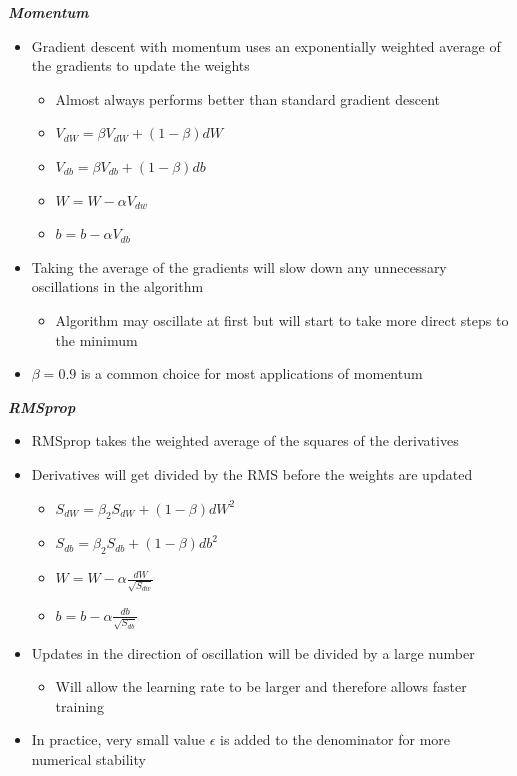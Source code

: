 \documentclass[12pt, letterpaper]{article}
\begin{document}
    \vspace{5mm}
    \textbf{\textit{Momentum}}
    \begin{itemize}
        \item Gradient descent with momentum uses an exponentially weighted average of the gradients to update the weights
        \begin{itemize}
            \item Almost always performs better than standard gradient descent
            \item[] $V_{dW}=\beta V_{dW}+(1-\beta)dW$
            \item[] $V_{db}=\beta V_{db}+(1-\beta)db$
            \item[] $W=W-\alpha V_{dw}$
            \item[] $b=b-\alpha V_{db}$
        \end{itemize}
        
        
        
        \item Taking the average of the gradients will slow down any unnecessary oscillations in the algorithm
        \begin{itemize}
            \item Algorithm may oscillate at first but will start to take more direct steps to the minimum
        \end{itemize}
        \item $\beta=0.9$ is a common choice for most applications of momentum
    \end{itemize}

    \vspace{5mm}
    \textbf{\textit{RMSprop}}
    \begin{itemize}
        \item RMSprop takes the weighted average of the squares of the derivatives
        \item Derivatives will get divided by the RMS before the weights are updated
        \begin{itemize}
            \item[] $S_{dW}=\beta_2S_{dW}+(1-\beta)dW^2$
            \item[] $S_{db}=\beta_2S_{db}+(1-\beta)db^2$
            \item[] $W=W-\alpha\frac{dW}{\sqrt{S_{dw}}}$
            \item[] $b=b-\alpha\frac{db}{\sqrt{S_{db}}}$
        \end{itemize}
        \item Updates in the direction of oscillation will be divided by a large number
        \begin{itemize}
            \item Will allow the learning rate to be larger and therefore allows faster training
        \end{itemize}
        \item In practice, very small value $\epsilon$ is added to the denominator for more numerical stability
    \end{itemize}
\end{document}
